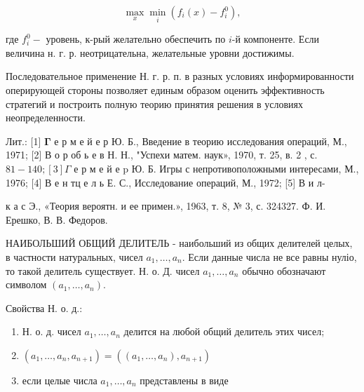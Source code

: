 \documentclass[10pt]{article}
\begin{document}
\[

\max _{x} \min _{i}\left(f_{i}(x)-f_{i}^{0}\right),

\]



где $f_{i}^{0}-$ уровень, к-рый желательно обеспечить по $i$-й компоненте. Если величина н. г. р. неотрицательна, желательные уровни достижимы.



Последовательное применение Н. г. р. п. в разных условиях информированности оперирующей стороны позволяет единым образом оценить эффективность стратегий и построить полную теорию принятия решения в условиях неопределенности.



Лит.: [1] $\boldsymbol{\Gamma}$ е р м е й е р Ю. Б., Введение в теорию исследования операций, М., 1971; [2] В о р об ь е в Н. Н., "Успехи матем. наук», 1970, т. 25, в. 2 , с. $81-140 ;[3] \Gamma$ е р м е й е $\mathrm{p}$ Ю. Б. Игры с непротивоположными интересами, М., 1976; [4] В е н тц е л ь Е. С., Исследование операций, М., 1972; [5] В и л-

к а с Э., «Теория вероятн. и ее примен.», 1963, т. 8, № 3, с. 324327. Ф. И. Ерешко, В. В. Федоров.



НАИБОЛЬШИЙ ОБЩИЙ ДЕЛИТЕЛЬ - наибольший из общих делителей целых, в частности натуральных, чисел $a_{1}, \ldots, a_{n}$. Если данные числа не все равны нуліо, то такой делитель существует. Н. о. Д. чисел $a_{1}, \ldots, a_{n}$ обычно обозначают символом $\left(a_{1}, \ldots, a_{n}\right)$.



Свойства Н. о. д.:



\begin{enumerate}

  \item Н. о. д. чисел $a_{1}, \ldots, a_{n}$ делится на любой общий делитель этих чисел;



  \item $\left(a_{1}, \ldots, a_{n}, a_{n+1}\right)=\left(\left(a_{1}, \ldots, a_{n}\right), a_{n+1}\right)$



  \item если целые числа $a_{1}, \ldots, a_{n}$ представлены в виде



\end{enumerate}
\end{document}
